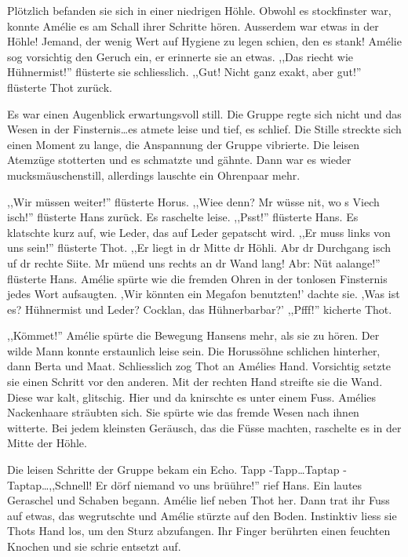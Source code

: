 \documentclass[11pt,titlepage,a5paper]{book}
\begin{document}
Plötzlich befanden sie sich in einer niedrigen Höhle. Obwohl es stockfinster war, konnte Amélie es am Schall ihrer Schritte hören. Ausserdem war etwas in der Höhle! Jemand, der wenig Wert auf Hygiene zu legen schien, den es stank! Amélie sog vorsichtig den Geruch ein, er erinnerte sie an etwas. ,,Das riecht wie Hühnermist!'' flüsterte sie schliesslich. ,,Gut! Nicht ganz exakt, aber gut!'' flüsterte Thot zurück.

Es war einen Augenblick erwartungsvoll still. Die Gruppe regte sich nicht und das Wesen in der Finsternis\dots es atmete leise und tief, es schlief. Die Stille streckte sich einen Moment zu lange, die Anspannung der Gruppe vibrierte. Die leisen Atemzüge stotterten und es schmatzte und gähnte. Dann war es wieder mucksmäuschenstill, allerdings lauschte ein Ohrenpaar mehr.

,,Wir müssen weiter!'' flüsterte Horus. ,,Wiee denn? Mr wüsse nit, wo s Viech isch!'' flüsterte Hans zurück.  Es raschelte leise. ,,Psst!'' flüsterte Hans. Es klatschte kurz auf, wie Leder, das auf Leder gepatscht wird. ,,Er muss links von uns sein!'' flüsterte Thot. ,,Er liegt in dr Mitte dr Höhli. Abr dr Durchgang isch uf dr rechte Siite. Mr müend uns rechts an dr Wand lang! Abr: Nüt aalange!'' flüsterte Hans. Amélie spürte wie die fremden Ohren in der tonlosen Finsternis jedes Wort aufsaugten. ,Wir könnten ein Megafon benutzten!' dachte sie. ,Was ist es? Hühnermist und Leder? Cocklan, das Hühnerbarbar?' ,,Pfff!'' kicherte Thot.

,,Kömmet!'' Amélie spürte die Bewegung Hansens mehr, als sie zu hören. Der wilde Mann konnte erstaunlich leise sein. Die Horussöhne schlichen hinterher, dann Berta und Maat. Schliesslich zog Thot an Amélies Hand. Vorsichtig setzte sie einen Schritt vor den anderen.  Mit der rechten Hand streifte sie die Wand. Diese war kalt, glitschig. Hier und da knirschte es unter einem Fuss. Amélies Nackenhaare sträubten sich. Sie spürte wie das fremde Wesen nach ihnen witterte. Bei jedem kleinsten Geräusch, das die Füsse machten, raschelte es in der Mitte der Höhle.

Die leisen Schritte der Gruppe bekam ein Echo. Tapp -Tapp\dots Taptap -Taptap\dots ,,Schnell! Er dörf niemand vo uns brüühre!'' rief Hans. Ein lautes Geraschel und Schaben begann. Amélie lief neben Thot her. Dann trat ihr Fuss auf etwas, das wegrutschte und Amélie stürzte auf den Boden. Instinktiv liess sie Thots Hand los, um den Sturz abzufangen. Ihr Finger berührten einen feuchten Knochen und sie schrie entsetzt auf. 
\end{document}
